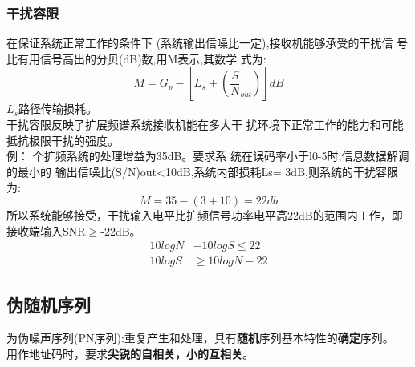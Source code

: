 \subsubsection{干扰容限
}
在保证系统正常工作的条件下
(系统输出信噪比一定),接收机能够承受的干扰信
号比有用信号高出的分贝(dB)数,用M表示,其数学
式为:
\begin{equation}\label{key}
M = G_p - [L_s + (\frac{S}{N}_{out})]dB
\end{equation}
$ L_s $路径传输损耗。\\
干扰容限反映了扩展频谱系统接收机能在多大干
扰环境下正常工作的能力和可能抵抗极限干扰的强度。\\
例：
个扩频系统的处理增益为35dB。要求系
统在误码率小于l0-5时,信息数据解调的最小的
输出信噪比(S/N)out<10dB,系统内部损耗Ls=
3dB,则系统的干扰容限为:
\begin{equation}\label{key}
M = 35 - (3+10) = 22db
\end{equation}
所以系统能够接受，干扰输入电平比扩频信号功率电平高22dB的范围内工作，即接收端输入SNR$\ge$-22dB。
\begin{align*}\label{key}
10logN &- 10logS  \le 22	\\
10logS & \ge 10logN - 22 
\end{align*}
\subsection{伪随机序列
}
为伪噪声序列(PN序列):重复产生和处理，具有\textbf{随机}序列基本特性的\textbf{确定}序列。\\
用作地址码时，要求\textbf{尖锐的自相关，小的互相关}。

